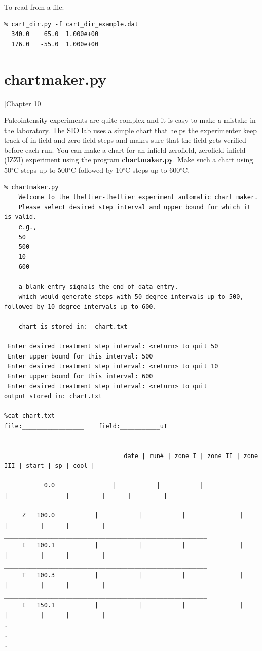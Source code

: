\documentclass[11pt]{book}
\begin{document}
{{{{{To read from a file:

\begin{verbatim}
% cart_dir.py -f cart_dir_example.dat
  340.0    65.0  1.000e+00
  176.0   -55.0  1.000e+00
\end{verbatim} 

\section{chartmaker.py}
\label{ex:chartmaker}
\href{http://magician.ucsd.edu/Essentials/WebBook2.html#Paleointensity}{[Chapter 10]}

Paleointensity experiments are quite complex and it is easy to make a mistake in the laboratory.  The SIO lab uses a simple chart that helps the experimenter keep track of in-field and zero field steps and makes sure that the field gets verified before each run.   You can make a chart for an infield-zerofield, zerofield-infield (IZZI) experiment using the program {\bf chartmaker.py}.   Make such a chart using 50$^{\circ}$C steps up to 500$^{\circ}$C  followed by 10$^{\circ}$C steps up to 600$^{\circ}$C.

\begin{verbatim}
% chartmaker.py
    Welcome to the thellier-thellier experiment automatic chart maker.   
    Please select desired step interval and upper bound for which it is valid.
    e.g.,   
    50 
    500
    10 
    600
    
    a blank entry signals the end of data entry.
    which would generate steps with 50 degree intervals up to 500, followed by 10 degree intervals up to 600.   
    
    chart is stored in:  chart.txt
    
 Enter desired treatment step interval: <return> to quit 50
 Enter upper bound for this interval: 500
 Enter desired treatment step interval: <return> to quit 10
 Enter upper bound for this interval: 600
 Enter desired treatment step interval: <return> to quit 
output stored in: chart.txt

%cat chart.txt
file:_________________    field:___________uT


                                 date | run# | zone I | zone II | zone III | start | sp | cool |
________________________________________________________
		   0.0	              |           |           |               |                |         |      |         |
________________________________________________________
	 Z 	 100.0           |           |           |               |                |         |      |         |
________________________________________________________
	 I 	 100.1           |           |           |               |                |         |      |         |
________________________________________________________
	 T 	 100.3           |           |           |               |                |         |      |         |
________________________________________________________
	 I 	 150.1           |           |           |               |                |         |      |         |
.
.
.


\end{verbatim}}}}}}
\end{document}
